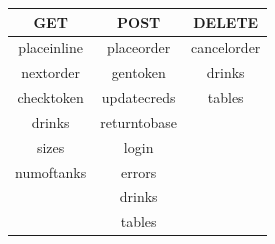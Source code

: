 \documentclass [10pt]{article}
\begin{document}
\begin{center}
	\begin{tabular}{ |c|c|c| } 
		\hline
		\textbf{GET} & \textbf{POST} & \textbf{DELETE} \\ \hline
		placeinline & placeorder & cancelorder \\ \hline
		nextorder & gentoken & drinks \\ \hline
		checktoken & updatecreds & tables \\ \hline
		drinks & returntobase &  \\ \hline
		sizes & login &  \\ \hline
		numoftanks & errors &  \\ \hline
		& drinks &  \\ \hline
		& tables &  \\ \hline
	\end{tabular}
\end{center}
\end{document}

